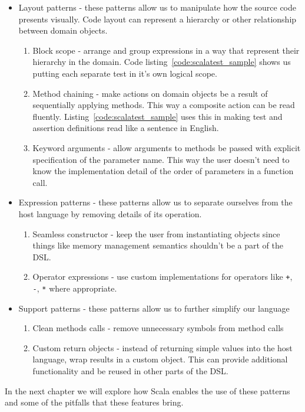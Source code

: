 \begin{itemize}
	\item Layout patterns - these patterns allow us to manipulate how the source code presents visually. Code layout can represent a hierarchy or other relationship between domain objects.
	\begin{enumerate}
		\item Block scope - arrange and group expressions in a way that represent their hierarchy in the domain. Code listing~\ref{code:scalatest_sample} shows us putting each separate test in it's own logical scope.
		\item Method chaining - make actions on domain objects be a result of sequentially applying methods. This way a composite action can be read fluently. Listing~\ref{code:scalatest_sample} uses this in making test and assertion definitions read like a sentence in English.
		\item Keyword arguments - allow arguments to methods be passed with explicit specification of the parameter name. This way the user doesn't need to know the implementation detail of the order of parameters in a function call.
	\end{enumerate}
	\item Expression patterns - these patterns allow us to separate ourselves from the host language by removing details of its operation.
	\begin{enumerate}
		\item Seamless constructor - keep the user from instantiating objects since things like memory management semantics shouldn't be a part of the DSL.
		\item Operator expressions - use custom implementations for operators like \texttt{+}, \texttt{-}, \texttt{*} where appropriate.
	\end{enumerate}
	\item Support patterns - these patterns allow us to further simplify our language
	\begin{enumerate}
		\item Clean methods calls - remove unnecessary symbols from method calls
		\item Custom return objects - instead of returning simple values into the host language, wrap results in a custom object. This can provide additional functionality and be reused in other parts of the DSL.
	\end{enumerate}
\end{itemize}

In the next chapter we will explore how Scala enables the use of these patterns and some of the pitfalls that these features bring.
